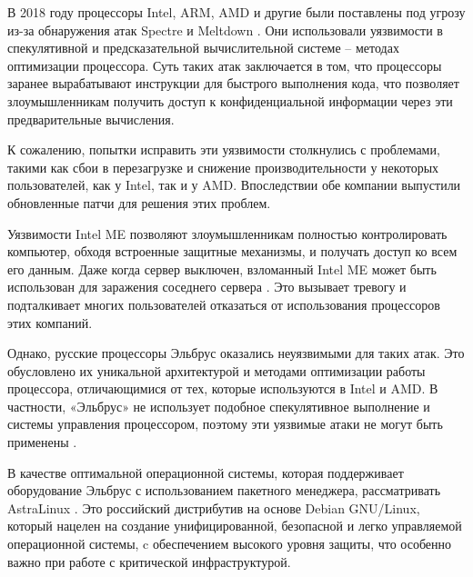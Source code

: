 В 2018 году процессоры Intel, ARM, AMD и другие были поставлены под угрозу из-за обнаружения атак Spectre и Meltdown \cite{risk:spectual_hack}. Они использовали уязвимости в спекулятивной и предсказательной вычислительной системе -- методах оптимизации процессора. Суть таких атак заключается в том, что процессоры заранее вырабатывают инструкции для быстрого выполнения кода, что позволяет злоумышленникам получить доступ к конфиденциальной информации через эти предварительные вычисления.

К сожалению, попытки исправить эти уязвимости столкнулись с проблемами, такими как сбои в перезагрузке и снижение производительности у некоторых пользователей, как у Intel, так и у AMD. Впоследствии обе компании выпустили обновленные патчи для решения этих проблем.

Уязвимости Intel ME позволяют злоумышленникам полностью контролировать компьютер, обходя встроенные защитные механизмы, и получать доступ ко всем его данным. Даже когда сервер выключен, взломанный Intel ME может быть использован для заражения соседнего сервера \cite{risk:intelme}. Это вызывает тревогу и подталкивает многих пользователей отказаться от использования процессоров этих компаний.

Однако, русские процессоры Эльбрус оказались неуязвимыми для таких атак. Это обусловлено их уникальной архитектурой и методами оптимизации работы процессора, отличающимися от тех, которые используются в Intel и AMD. В частности, «Эльбрус» не использует подобное спекулятивное выполнение и системы управления процессором, поэтому эти уязвимые атаки не могут быть применены \cite{risk:elbrus_no_spectre}.


В качестве оптимальной операционной системы, которая поддерживает оборудование Эльбрус с использованием пакетного менеджера, рассматривать AstraLinux \cite{dev:astra_linux}. Это российский дистрибутив на основе Debian GNU/Linux, который нацелен на создание унифицированной, безопасной и легко управляемой операционной системы, c обеспечением высокого уровня защиты, что особенно важно при работе с критической инфраструктурой.


